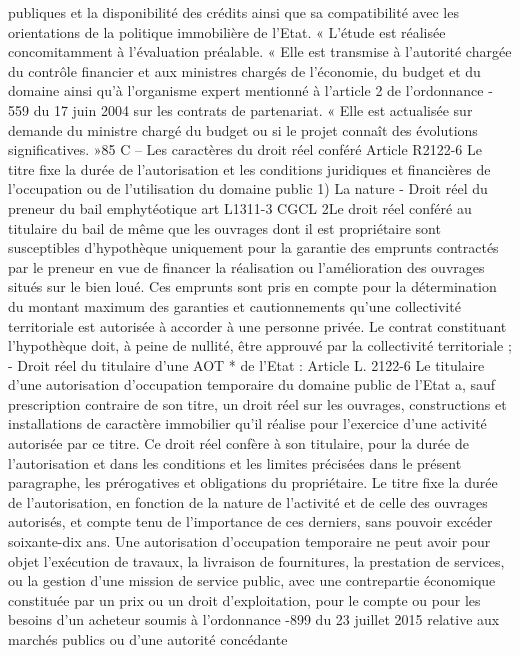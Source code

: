 \documentclass[11pt,a4paper]{report}
\begin{document}
publiques et la disponibilité des crédits ainsi que sa compatibilité avec les orientations de la politique
immobilière de l'Etat.
« L'étude est réalisée concomitamment à l'évaluation préalable.
« Elle est transmise à l'autorité chargée du contrôle financier et aux ministres chargés de l'économie,
du budget et du domaine ainsi qu'à l'organisme expert mentionné à l'article 2 de l'ordonnance -
559 du 17 juin 2004 sur les contrats de partenariat.
« Elle est actualisée sur demande du ministre chargé du budget ou si le projet connaît des évolutions
significatives. »85
C – Les caractères du droit réel conféré
Article R2122-6
Le titre fixe la durée de l'autorisation et les conditions juridiques et financières de l'occupation ou de l'utilisation
du domaine public
1\degre ) La nature
- Droit réel du preneur du bail emphytéotique art L1311-3 CGCL
2\degre  Le droit réel conféré au titulaire du bail de même que les ouvrages dont il est propriétaire sont susceptibles
d'hypothèque uniquement pour la garantie des emprunts contractés par le preneur en vue de financer la
réalisation ou l'amélioration des ouvrages situés sur le bien loué.
Ces emprunts sont pris en compte pour la détermination du montant maximum des garanties et cautionnements
qu'une collectivité territoriale est autorisée à accorder à une personne privée.
Le contrat constituant l'hypothèque doit, à peine de nullité, être approuvé par la collectivité territoriale ;
- Droit réel du titulaire d’une AOT
* de l’Etat : Article L. 2122-6
Le titulaire d'une autorisation d'occupation temporaire du domaine public de l'Etat a, sauf prescription
contraire de son titre, un droit réel sur les ouvrages, constructions et installations de caractère immobilier qu'il
réalise pour l'exercice d'une activité autorisée par ce titre.
Ce droit réel confère à son titulaire, pour la durée de l'autorisation et dans les conditions et les limites précisées
dans le présent paragraphe, les prérogatives et obligations du propriétaire.
Le titre fixe la durée de l'autorisation, en fonction de la nature de l'activité et de celle des ouvrages autorisés, et
compte tenu de l'importance de ces derniers, sans pouvoir excéder soixante-dix ans.
Une autorisation d'occupation temporaire ne peut avoir pour objet l'exécution de travaux, la livraison de
fournitures, la prestation de services, ou la gestion d'une mission de service public, avec une contrepartie
économique constituée par un prix ou un droit d'exploitation, pour le compte ou pour les besoins d'un acheteur
soumis à l'ordonnance -899 du 23 juillet 2015 relative aux marchés publics ou d'une autorité concédante
\end{document}
